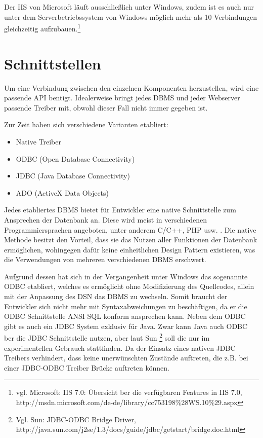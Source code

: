 Der IIS von Microsoft läuft ausschließlich unter Windows, zudem ist es auch nur unter dem Serverbetriebssystem von Windows möglich mehr als 10 Verbindungen gleichzeitig aufzubauen.\footnote{vgl. Microsoft: IIS 7.0: Übersicht ber die verfügbaren Features in IIS 7.0, http://msdn.microsoft.com/de-de/library/cc753198\%28WS.10\%29.aspx}

\section{Schnittstellen}
\label{sec:schnittstellen}


Um eine Verbindung zwischen den einzelnen Komponenten herzustellen, wird eine passende API bentigt.
Idealerweise bringt jedes DBMS und jeder Webserver passende Treiber mit, obwohl dieser Fall nicht immer gegeben ist.

Zur Zeit haben sich verschiedene Varianten etabliert:

\begin{itemize}
\item Native Treiber
\item ODBC (Open Database Connectivity)
\item JDBC (Java Database Connectivity)
\item ADO (ActiveX Data Objects)
\end{itemize}

Jedes etabliertes DBMS bietet für Entwickler eine native Schnittstelle zum Ansprechen der Datenbank an.
Diese wird meist in verschiedenen Programmiersprachen angeboten, unter anderem C/C++, PHP usw. .
Die native Methode besitzt den Vorteil, dass sie das Nutzen aller Funktionen der Datenbank ermöglichen, wohingegen dafür keine einheitlichen Design Pattern existieren, was die Verwendungen von mehreren
verschiedenen DBMS erschwert.

Aufgrund dessen hat sich in der Vergangenheit unter Windows das sogenannte ODBC etabliert, welches es ermöglicht ohne Modifizierung des Quellcodes, allein mit der Anpassung des DSN das DBMS zu wechseln.
Somit braucht der Entwickler sich nicht mehr mit Syntaxabweichungen zu beschäftigen, da er die ODBC Schnittstelle ANSI SQL konform ansprechen kann.
Neben dem ODBC gibt es auch ein JDBC System exklusiv für Java. Zwar kann Java auch ODBC ber die JDBC Schnittstelle nutzen, aber laut Sun \footnote{Vgl. Sun: JDBC-ODBC Bridge Driver, http://java.sun.com/j2se/1.3/docs/guide/jdbc/getstart/bridge.doc.html} soll die nur im experimentellen Gebrauch stattfinden.
Da der Einsatz eines nativen JDBC Treibers verhindert, dass keine unerwünschten Zustände auftreten, die z.B. bei einer JDBC-ODBC Treiber Brücke auftreten können.

